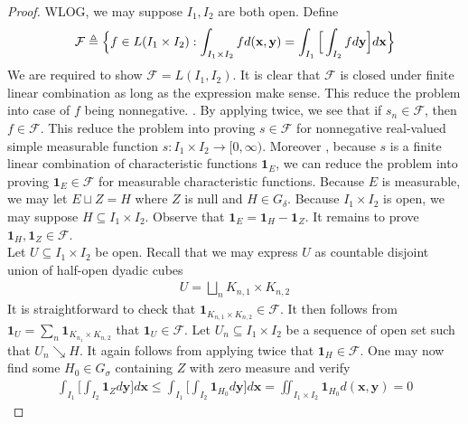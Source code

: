 \documentclass{report}
\begin{document}
\begin{proof}
WLOG, we may suppose $I_1,I_2$ are both open. Define 
\begin{align*}
\mathcal{F}\triangleq \Big\{ f\in L(I_1 \times I_2):\int_{I_1 \times I_2}fd(\textbf{x},\textbf{y})=\int_{I_1}\Big[\int_{I_2}fd\textbf{y} \Big]d\textbf{x} \Big\}
\end{align*}
We are required to show $\mathcal{F}=L(I_1,I_2)$. It is clear that $\mathcal{F}$ is closed under finite linear combination as long as the expression make sense. This reduce the problem into case of $f$ being nonnegative. \customref{Approximation of nonnegative function by increasing simple function}{Let $s_n:I_1\times I_2\rightarrow [0,\infty)$ be a sequence of simple measurable functions such that $s_n\nearrow f$}. By applying  twice, we see that if $s_n \in \mathcal{F}$, then $f\in \mathcal{F}$. This reduce the problem into proving $s \in \mathcal{F}$ for nonnegative real-valued simple measurable function $s:I_1\times I_2\rightarrow [0,\infty)$. Moreover , because $s$ is a finite linear combination of characteristic functions  $\textbf{1}_E$, we can reduce the problem into proving $\textbf{1}_E\in \mathcal{F}$ for measurable characteristic functions. Because $E$ is measurable, we may let  $E\sqcup  Z=H$ where $Z$ is null and $H \in G_\delta$. Because $I_1 \times I_2$ is open, we may suppose $H \subseteq I_1 \times I_2$. Observe that $\textbf{1}_E=\textbf{1}_H - \textbf{1}_Z$. It remains to prove $\textbf{1}_H,\textbf{1}_Z \in \mathcal{F}$. \\


Let $U \subseteq I_1 \times I_2$ be open. Recall that we may express $U$ as  countable disjoint union of half-open dyadic cubes 
\begin{align*}
U=\bigsqcup_n K_{n,1}\times K_{n,2}
\end{align*}
It is straightforward to check that $\textbf{1}_{K_{n,1}\times K_{n,2}}\in \mathcal{F}$. It then follows from $\textbf{1}_U= \sum_{n} \textbf{1}_{K_{n_1}\times K_{n,2}}$ that $\textbf{1}_U \in \mathcal{F}$. Let $U_n\subseteq I_1 \times I_2$  be a sequence of open set such that $U_n\searrow H$. It again follows from applying  twice that $\textbf{1}_H\in \mathcal{F}$. One may now find some $H_0\in G_\sigma$ containing  $Z$ with zero measure and verify 
\begin{align*}
\int_{I_1}\Big[ \int_{I_2} \textbf{1}_Z d\textbf{y}\Big]d\textbf{x}\leq \int_{I_1} \Big[ \int_{I_2} \textbf{1}_{H_0}d\textbf{y} \Big] d\textbf{x}=\iint_{I_1 \times I_2}\textbf{1}_{H_0} d(\textbf{x},\textbf{y})=0 
\end{align*}
\end{proof}
\end{document}

